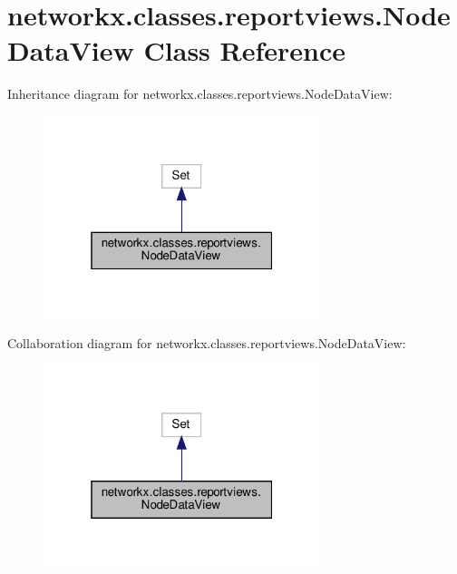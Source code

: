 \hypertarget{classnetworkx_1_1classes_1_1reportviews_1_1NodeDataView}{}\section{networkx.\+classes.\+reportviews.\+Node\+Data\+View Class Reference}
\label{classnetworkx_1_1classes_1_1reportviews_1_1NodeDataView}


Inheritance diagram for networkx.\+classes.\+reportviews.\+Node\+Data\+View\+:
\nopagebreak
\begin{figure}[H]
\begin{center}
\leavevmode
\includegraphics[width=229pt]{classnetworkx_1_1classes_1_1reportviews_1_1NodeDataView__inherit__graph}
\end{center}
\end{figure}


Collaboration diagram for networkx.\+classes.\+reportviews.\+Node\+Data\+View\+:
\nopagebreak
\begin{figure}[H]
\begin{center}
\leavevmode
\includegraphics[width=229pt]{classnetworkx_1_1classes_1_1reportviews_1_1NodeDataView__coll__graph}
\end{center}
\end{figure}
